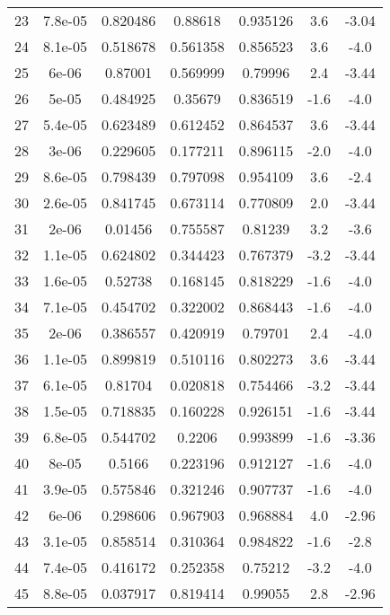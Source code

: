 \begin{table}
\begin{tabular}{c|c|c|c|c|c|c}
23 & 7.8e-05 & 0.820486 & 0.88618 & 0.935126 & 3.6 & -3.04\\
24 & 8.1e-05 & 0.518678 & 0.561358 & 0.856523 & 3.6 & -4.0\\
25 & 6e-06 & 0.87001 & 0.569999 & 0.79996 & 2.4 & -3.44\\
26 & 5e-05 & 0.484925 & 0.35679 & 0.836519 & -1.6 & -4.0\\
27 & 5.4e-05 & 0.623489 & 0.612452 & 0.864537 & 3.6 & -3.44\\
28 & 3e-06 & 0.229605 & 0.177211 & 0.896115 & -2.0 & -4.0\\
29 & 8.6e-05 & 0.798439 & 0.797098 & 0.954109 & 3.6 & -2.4\\
30 & 2.6e-05 & 0.841745 & 0.673114 & 0.770809 & 2.0 & -3.44\\
31 & 2e-06 & 0.01456 & 0.755587 & 0.81239 & 3.2 & -3.6\\
32 & 1.1e-05 & 0.624802 & 0.344423 & 0.767379 & -3.2 & -3.44\\
33 & 1.6e-05 & 0.52738 & 0.168145 & 0.818229 & -1.6 & -4.0\\
34 & 7.1e-05 & 0.454702 & 0.322002 & 0.868443 & -1.6 & -4.0\\
35 & 2e-06 & 0.386557 & 0.420919 & 0.79701 & 2.4 & -4.0\\
36 & 1.1e-05 & 0.899819 & 0.510116 & 0.802273 & 3.6 & -3.44\\
37 & 6.1e-05 & 0.81704 & 0.020818 & 0.754466 & -3.2 & -3.44\\
38 & 1.5e-05 & 0.718835 & 0.160228 & 0.926151 & -1.6 & -3.44\\
39 & 6.8e-05 & 0.544702 & 0.2206 & 0.993899 & -1.6 & -3.36\\
40 & 8e-05 & 0.5166 & 0.223196 & 0.912127 & -1.6 & -4.0\\
41 & 3.9e-05 & 0.575846 & 0.321246 & 0.907737 & -1.6 & -4.0\\
42 & 6e-06 & 0.298606 & 0.967903 & 0.968884 & 4.0 & -2.96\\
43 & 3.1e-05 & 0.858514 & 0.310364 & 0.984822 & -1.6 & -2.8\\
44 & 7.4e-05 & 0.416172 & 0.252358 & 0.75212 & -3.2 & -4.0\\
45 & 8.8e-05 & 0.037917 & 0.819414 & 0.99055 & 2.8 & -2.96\\
\end{tabular}
\end{table}
\newpage
